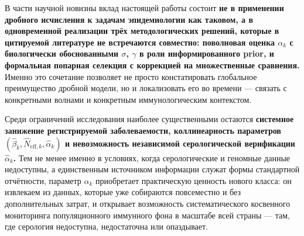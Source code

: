 \documentclass[12pt]{article}
\begin{document}
В части научной новизны вклад настоящей работы состоит \textbf{не в
применении дробного исчисления к задачам эпидемиологии как таковом, а в
одновременной реализации трёх методологических решений, которые в
цитируемой литературе не встречаются совместно: поволновая оценка
\(\alpha_k\) с биологически обоснованными \(\sigma\), \(\gamma\) в роли
информированного prior, и формальная попарная селекция с коррекцией на
множественные сравнения.} Именно это сочетание позволяет не просто
констатировать глобальное преимущество дробной модели, но и локализовать
его во времени --- связать с конкретными волнами и конкретным
иммунологическим контекстом.

Среди ограничений исследования наиболее существенными остаются
\textbf{системное занижение регистрируемой заболеваемости,
коллинеарность параметров
\((\hat{\beta}_k, \hat{N}_{\text{eff},k}, \hat{\alpha}_k)\) и
невозможность независимой серологической верификации
\(\hat{\alpha}_k\).} Тем не менее именно в условиях, когда
серологические и геномные данные недоступны, а единственным источником
информации служат формы стандартной отчётности, параметр \(\alpha_k\)
приобретает практическую ценность нового класса: он извлекаем из данных,
которые уже собираются повсеместно и без дополнительных затрат, и
открывает возможность систематического косвенного мониторинга
популяционного иммунного фона в масштабе всей страны --- там, где
серология недоступна, недостаточна или опаздывает.
\end{document}
